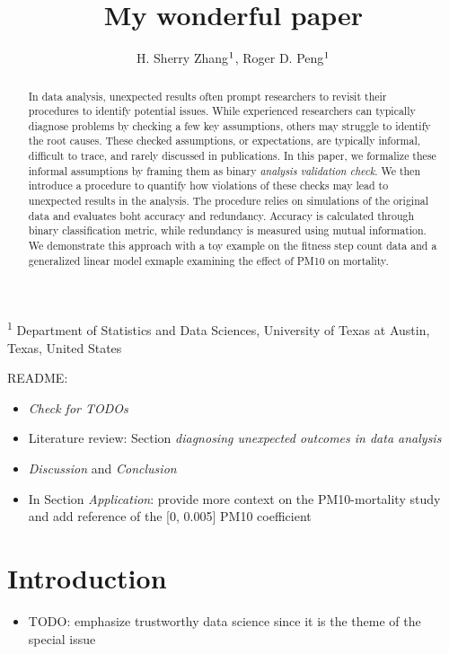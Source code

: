 \documentclass[
  12pt,
]{interact}
\title{My wonderful paper}
\author{H. Sherry Zhang$\textsuperscript{1}$, Roger D.
Peng$\textsuperscript{1}$}
\providecommand{\tightlist}{%
  \setlength{\itemsep}{0pt}\setlength{\parskip}{0pt}}\usepackage{longtable,booktabs,array}
\begin{document}
\captionsetup{labelsep=space}
\maketitle
\textsuperscript{1} Department of Statistics and Data
Sciences, University of Texas at Austin, Texas, United States
\begin{abstract}
In data analysis, unexpected results often prompt researchers to revisit
their procedures to identify potential issues. While experienced
researchers can typically diagnose problems by checking a few key
assumptions, others may struggle to identify the root causes. These
checked assumptions, or expectations, are typically informal, difficult
to trace, and rarely discussed in publications. In this paper, we
formalize these informal assumptions by framing them as binary
\emph{analysis validation check}. We then introduce a procedure to
quantify how violations of these checks may lead to unexpected results
in the analysis. The procedure relies on simulations of the original
data and evaluates boht accuracy and redundancy. Accuracy is calculated
through binary classification metric, while redundancy is measured using
mutual information. We demonstrate this approach with a toy example on
the fitness step count data and a generalized linear model exmaple
examining the effect of PM10 on mortality.
\end{abstract}


README:

\begin{itemize}
\tightlist
\item
  \emph{Check for TODOs}
\item
  Literature review: Section \emph{diagnosing unexpected outcomes in
  data analysis}
\item
  \emph{Discussion} and \emph{Conclusion}
\item
  In Section \emph{Application}: provide more context on the
  PM10-mortality study and add reference of the {[}0, 0.005{]} PM10
  coefficient
\end{itemize}

\newpage

\section{Introduction}\label{introduction}

\begin{itemize}
\tightlist
\item
  TODO: emphasize trustworthy data science since it is the theme of the
  special issue
\end{itemize}
\end{document}
